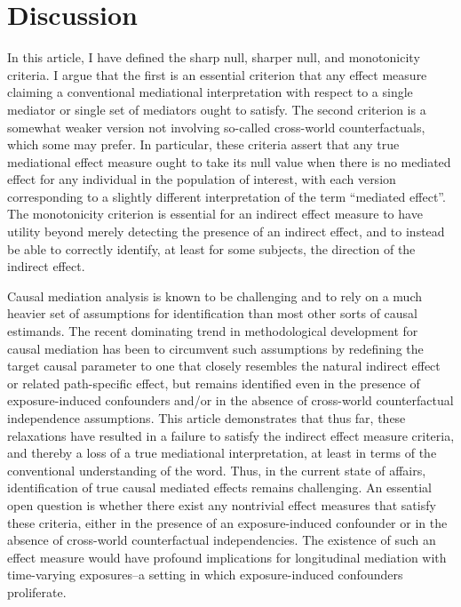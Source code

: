 \documentclass[12pt]{article}
\begin{document}


\section{Discussion}
\label{sec:discussion}
In this article, I have defined the sharp null, sharper null, and monotonicity criteria. I argue that the first is an essential criterion that any effect measure claiming a conventional mediational interpretation with respect to a single mediator or single set of mediators ought to satisfy. The second criterion is a somewhat weaker version not involving so-called cross-world counterfactuals, which some may prefer. In particular, these criteria assert that any true mediational effect measure ought to take its null value when there is no mediated effect for any individual in the population of interest, with each version corresponding to a slightly different interpretation of the term ``mediated effect''. The monotonicity criterion is essential for an indirect effect measure to have utility beyond merely detecting the presence of an indirect effect, and to instead be able to correctly identify, at least for some subjects, the direction of the indirect effect.

Causal mediation analysis is known to be challenging and to rely on a much heavier set of assumptions for identification than most other sorts of causal estimands. The recent dominating trend in methodological development for causal mediation has been to circumvent such assumptions by redefining the target causal parameter to one that closely resembles the natural indirect effect or related path-specific effect, but remains identified even in the presence of exposure-induced confounders and/or in the absence of cross-world counterfactual independence assumptions. This article demonstrates that thus far, these relaxations have resulted in a failure to satisfy the indirect effect measure criteria, and thereby a loss of a true mediational interpretation, at least in terms of the conventional understanding of the word. %
Thus, in the current state of affairs, identification of true causal mediated effects remains challenging. An essential open question is whether there exist any nontrivial effect measures that satisfy these criteria, either in the presence of an exposure-induced confounder or in the absence of cross-world counterfactual independencies. The existence of such an effect measure would have profound implications for longitudinal mediation with time-varying exposures--a setting in which exposure-induced confounders proliferate.
\end{document}
